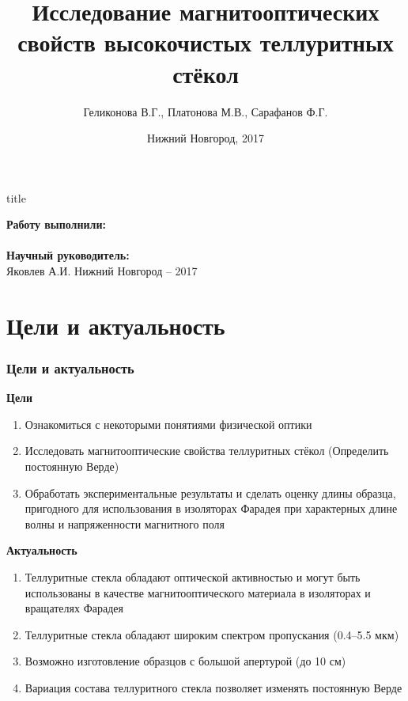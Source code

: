 \documentclass[10pt,pdf,hyperref={unicode}, dvipsnames]{beamer}
\title[Магнитооптическая активность теллуритных стёкол]{Исследование магнитооптических свойств высокочистых теллуритных стёкол}
\author{%
	Геликонова В.Г., %
	Платонова М.В., %
	Сарафанов Ф.Г. %
}
\institute{Радиофизический факультет ННГУ, 420 группа}
\date{Нижний Новгород, 2017}
\begin{document}
  

\begin{frame}[plain]
	\centering
	\vspace{2cm}
	\begin{beamercolorbox}[sep=8pt,center]{title}
		\bf{}\inserttitle
	\end{beamercolorbox}
	\vspace{0.5cm}
	\normalsize \textbf{Работу выполнили:}\\
	\large\insertauthor\\ 
	\vspace{0.5cm}
	\normalsize{\textbf{Научный руководитель:}\\}
	\large{Яковлев А.И.}
	\vfill
	\small{Нижний Новгород -- 2017}
\end{frame}
\section{Цели и актуальность}
\begin{frame}[t]
	\frametitle{Цели и актуальность}
	\textbf{Цели}\\
	\begin{enumerate}
		\item Ознакомиться с некоторыми понятиями физической оптики
		\item Исследовать магнитооптические свойства теллуритных стёкол (Определить постоянную Верде)
		\item Обработать экспериментальные  результаты и сделать оценку длины образца, пригодного для использования в изоляторах Фарадея 
		при характерных длине волны и напряженности магнитного поля
	\end{enumerate}
	\textbf{Актуальность}\\
	\begin{enumerate}
		\item Теллуритные стекла обладают оптической активностью и могут быть использованы в качестве магнитооптического материала в изоляторах и вращателях Фарадея
		\item Теллуритные стекла обладают широким спектром пропускания (0.4--5.5  мкм) %
		\item Возможно изготовление образцов с большой апертурой (до 10 см)
		\item Вариация состава теллуритного стекла позволяет изменять постоянную Верде
	\end{enumerate}
\end{frame}
\end{document}
